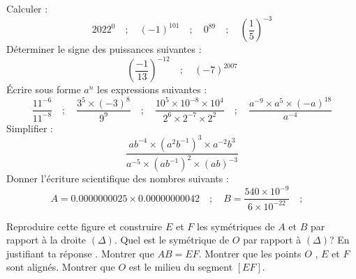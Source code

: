 \documentclass[a4paper,addpoints,12pt]{exam}
\begin{document}
\devoir[prv=false,num=2 ,niv=2 , date=01/12/2022,Rdate=12/12/2022 ]

\begin{exo}
\begin{questions}
\question Calculer : 
\[ 2022^{0} \quad; \quad (-1)^{101} \quad; \quad 0^{89} \quad; \quad (\dfrac{1}{5})^{-3}\]
\question Déterminer le signe des puissances suivantes :
\[ (\dfrac{-1}{13})^{-12} \quad; \quad 
	(-7)^{2007}
\] 
\question Écrire sous forme $a^{n}$ les expressions suivantes :
\[\dfrac{11^{-6}}{11^{-8}}\quad; \quad
	\dfrac{3^{5}\times (-3)^{8}}{9^{9}}\quad; \quad
	\dfrac{10^{5}\times 10^{-8}\times 10^{4}}{2^{6}\times 2^{-7}\times 2^{2}}\quad; \quad
\dfrac{a^{-9}\times a^{5}\times (-a)^{18}}{a^{-4}}
\]
\question Simplifier : 
\[
\dfrac{ab^{-4}\times (a^{2}b^{-1})^{3}\times a^{-2}b^{3}}{a^{-5}\times (ab^{-1})^{2}\times (ab)^{-3}}
\]
\question Donner l'écriture scientifique des nombres suivants :
\[
	A=0.0000000025\times 0.00000000042 \quad; \quad
	B=\dfrac{540\times 10^{-9}}{6\times 10^{-22}}\quad; \quad
\]
\end{questions}
\end{exo}

\begin{exo}
\begin{minipage}{.5\textwidth}
\begin{questions}
\question Reproduire cette figure et construire $E$ et $F$ les symétriques de $A$ et $B$ par rapport à la droite  $(\Delta)$.
\question Quel est le symétrique de $O$ par rapport à $(\Delta)$? En justifiant ta réponse .
\question Montrer que $AB=EF$.
\question Montrer que les points $O$ , $E$ et $F$ sont alignés.
\question Montrer que $O$ est le milieu du segment $[EF]$.
\end{questions}
\end{minipage}
\begin{minipage}{.5\textwidth}
\end{minipage}
\end{exo}
\end{document}
